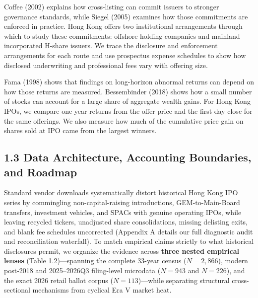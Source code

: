 \documentclass[11pt,letterpaper]{article}
\begin{document}
Coffee (2002) explains how cross-listing can commit issuers to stronger governance standards, while Siegel (2005) examines how those commitments are enforced in practice. Hong Kong offers two institutional arrangements through which to study these commitments: offshore holding companies and mainland-incorporated H-share issuers. We trace the disclosure and enforcement arrangements for each route and use prospectus expense schedules to show how disclosed underwriting and professional fees vary with offering size.

Fama (1998) shows that findings on long-horizon abnormal returns can depend on how those returns are measured. Bessembinder (2018) shows how a small number of stocks can account for a large share of aggregate wealth gains. For Hong Kong IPOs, we compare one-year returns from the offer price and the first-day close for the same offerings. We also measure how much of the cumulative price gain on shares sold at IPO came from the largest winners.

\subsection*{\texorpdfstring{1.3 Data Architecture, Accounting Boundaries, and Roadmap}{1.3 Data Architecture, Accounting Boundaries, and Roadmap}}
Standard vendor downloads systematically distort historical Hong Kong IPO series by commingling non-capital-raising introductions, GEM-to-Main-Board transfers, investment vehicles, and SPACs with genuine operating IPOs, while leaving recycled tickers, unadjusted share consolidations, missing delisting exits, and blank fee schedules uncorrected (Appendix A details our full diagnostic audit and reconciliation waterfall). To match empirical claims strictly to what historical disclosures permit, we organize the evidence across \textbf{three nested empirical lenses} (Table 1.2)—spanning the complete 33-year census ($N = 2,866$), modern post-2018 and 2025–2026Q3 filing-level microdata ($N = 943$ and $N = 226$), and the exact 2026 retail ballot corpus ($N = 113$)—while separating structural cross-sectional mechanisms from cyclical Era V market heat.
\end{document}
